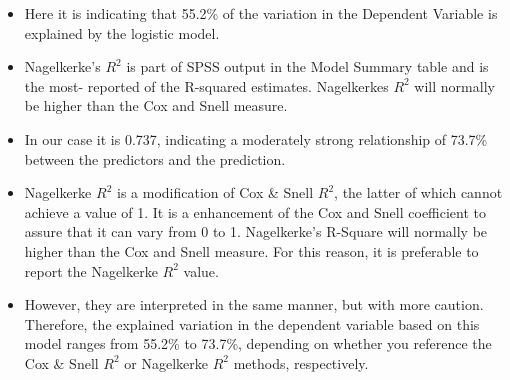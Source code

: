 \documentclass[a4paper,12pt]{article}
\begin{document}
\begin{itemize}
\item Here it is indicating that 55.2\% of the variation in the Dependent Variable is explained by the
logistic model. 






\item Nagelkerke's $R^2$ is part of SPSS output in the Model Summary table and is the most-
reported of the R-squared estimates. Nagelkerkes $R^2$ will normally be higher than the Cox and Snell measure.
\item In our case it is 0.737, indicating a moderately strong relationship of 73.7\% between the
predictors and the prediction.
\item Nagelkerke $R^2$ is a modification of Cox \& Snell $R^2$, the latter of which cannot achieve a value of 1. It is a enhancement of the Cox and Snell coefficient to assure that it can vary from 0 to 1. Nagelkerke's R-Square will normally be higher than the Cox and Snell measure. For this reason, it is preferable to report the Nagelkerke $R^2$ value.




\item  However, they are interpreted in the same manner, but with more caution. Therefore, the explained variation in the dependent variable based on this model ranges from 55.2\% to 73.7\%, depending on whether you reference the Cox \& Snell $R^2$ or Nagelkerke $R^2$ methods, respectively.

\end{itemize}

\end{document}
